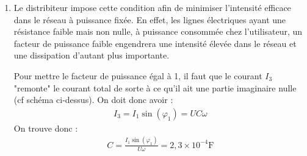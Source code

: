 \begin{correction}
\begin{enumerate}
        \item Le distribiteur impose cette condition afin de minimiser l'intensité efficace dans le réseau à puissance fixée. En effet, les lignes électriques ayant une résistance faible mais non nulle, à puissance consommée chez l'utilisateur, un facteur de puissance faible engendrera une intensité élevée dans le réseau et une dissipation d'autant plus importante. 

        Pour mettre le facteur de puissance égal à 1, il faut que le courant $I_3$ "remonte" le courant total de sorte à ce qu'il ait une partie imaginaire nulle (cf schéma ci-dessus). 
        On doit donc avoir : 
        \begin{align*}
            I_3=I_1\sin(\varphi_1)=UC\omega
        \end{align*}       
        On trouve donc : 
        \begin{align*}
            \boxed{C = \frac{I_1\sin(\varphi_1)}{U\omega}=2,3\times10^{-4}\mathrm{F}}
        \end{align*}  
    \end{enumerate}

\end{correction}